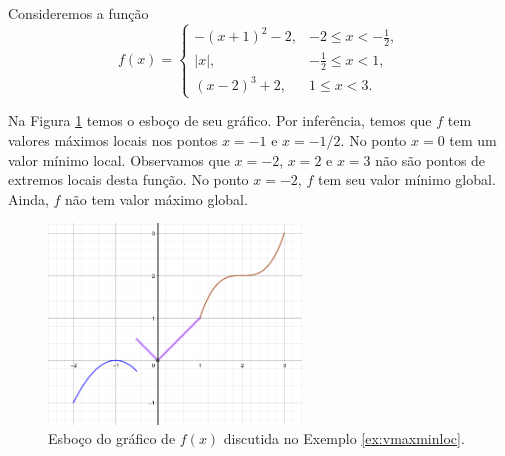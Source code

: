 \cleardoublepage\documentclass[../main.tex]{subfiles}
\begin{document}
 \begin{ex}\label{ex:vmaxminloc}
  Consideremos a função
  \begin{equation*}
    f(x) = \left\{
      \begin{array}{ll}
        -(x+1)^2-2, & -2\leq x < -\frac{1}{2},\\
        |x|, & -\frac{1}{2} \leq x < 1,\\
        (x-2)^3+2, & 1\leq x < 3.
      \end{array}
\right.
\end{equation*}

Na Figura \ref{fig:ex_vmaxminloc} temos o esboço de seu gráfico. Por inferência, temos que $f$ tem valores máximos locais nos pontos $x=-1$ e $x=-1/2$. No ponto $x=0$ tem um valor mínimo local. Observamos que $x=-2$, $x=2$ e $x=3$ não são pontos de extremos locais desta função. No ponto $x=-2$, $f$ tem seu valor mínimo global. Ainda, $f$ não tem valor máximo global.
\end{ex}
 \begin{figure}[hbt]
    \centering
    \includegraphics[width=0.6\textwidth]{fig_apl_deriv/FuncPartValMaxMin}
    \caption{Esboço do gráfico de $f(x)$ discutida no Exemplo \ref{ex:vmaxminloc}.}
    \label{fig:ex_vmaxminloc}
  \end{figure}
  
\end{document}
